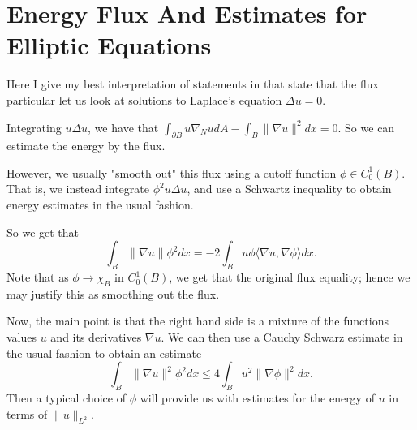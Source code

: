 \section{Energy Flux And Estimates for Elliptic Equations}

Here I give my best interpretation of statements in \cite{CaffarelliVasseur2010} that state that the flux
particular let us look at solutions to Laplace's equation \(\Delta u = 0\).

Integrating \(u\Delta u\), we have that \(\int_{\partial B} u \nabla_{N} u dA - \int_B \|\nabla u\|^2 dx = 0\).
So we can estimate the energy by the flux.

However, we usually "smooth out" this flux using a cutoff function \(\phi \in C_0^1(B)\). That is, we
instead integrate \(\phi^2 u\Delta u\), and use a Schwartz inequality to obtain energy estimates
in the usual fashion.  

So we get that 
\begin{equation}
\int_B \|\nabla u \|\phi^2 dx = - 2 \int_B u\phi \langle \nabla u, \nabla \phi \rangle dx. 
\end{equation}
Note that as \(\phi \to \chi_B\) in \(C^1_0(B)\), we get that the original flux equality; hence we may justify this
as smoothing out the flux.

Now, the main point is that the right hand side is a mixture of the functions values \(u\) and its derivatives \(\nabla u\). We 
can then use a Cauchy Schwarz estimate in the usual fashion to obtain an estimate
\begin{equation}
\int_B \|\nabla u\|^2 \phi^2 dx \leq 4 \int_B u^2 \|\nabla \phi\|^2 dx.
\end{equation}
Then a typical choice of \(\phi\) will provide us with estimates for the energy of \(u\) in terms of \(\|u\|_{L^2}\).
